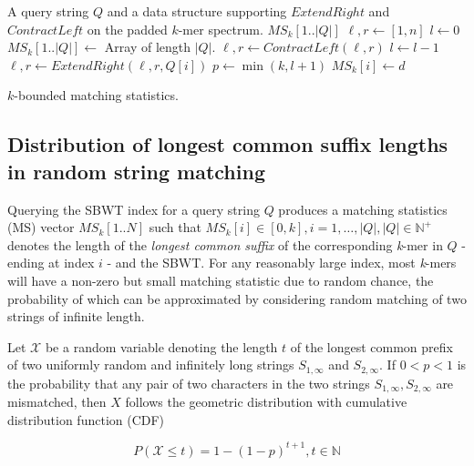 \documentclass[unnumsec,webpdf,contemporary,large]{oup-authoring-template}%
\theoremstyle{thmstyleone}%
\theoremstyle{thmstyletwo}%
\theoremstyle{thmstylethree}%
\begin{document}
\begin{algorithm}
\begin{algorithmic}[1]
\small
\Require A query string $Q$ and a data structure supporting $ExtendRight$ and $ContractLeft$ on the padded $k$-mer spectrum. %
\Ensure $MS_k[1..|Q|]$
\State $\ell, r \gets [1,n]$ 
\State $l \gets 0$ 
\State $MS_k[1..|Q|] \gets $ Array of length $|Q|$.
\label{line:MS-1-start}
    \State $\ell, r \gets ContractLeft(\ell, r)$
    \State $l \gets l-1$
\EndWhile \label{line:MS-1-end}
    \State $\ell, r \gets ExtendRight(\ell, r, Q[i])$\label{line:MS-2-start}
    \State $p \gets \min(k, l+1)$\label{line:MS-2-end}
\EndIf
\State $MS_k[i] \gets d$  \label{line:MS-4-assignment}
\EndFor
\caption{\small $k$-bounded matching statistics.} 
\label{alg:MS}
\end{algorithmic}
\end{algorithm}

\subsection{Distribution of longest common suffix lengths in random string matching}
Querying the SBWT index for a query string $Q$ produces a matching statistics (MS) vector  $MS_k[1..N]$ such that $MS_k[i] \in \left[0,k\right], i=1,\ldots , |Q|, |Q| \in \mathbb{N}^+ $ denotes the length of the \emph{longest common suffix} of the corresponding \emph{k}-mer in $Q$ - ending at index $i$ - and the SBWT. For any reasonably large index, most \emph{k}-mers will have a non-zero but small matching statistic due to random chance, the probability of which can be approximated by considering random matching of two strings of infinite length.

Let $\mathcal{X}$ be a random variable denoting the length $t$ of the longest common prefix of two uniformly random and infinitely long strings $S_{1,\infty}$ and $S_{2,\infty}$. If  $0 < p < 1$ is the probability that any pair of two characters in the two strings $S_{1,\infty}, S_{2,\infty}$ are mismatched, then $X$ follows the geometric distribution with cumulative distribution function (CDF)

\begin{equation}
    P\left(\mathcal{X} \leq t\right) = 1 - \left(1 - p\right)^{t + 1}, t \in \mathbb{N}
\label{geom-distribution}
\end{equation}
\end{document}
